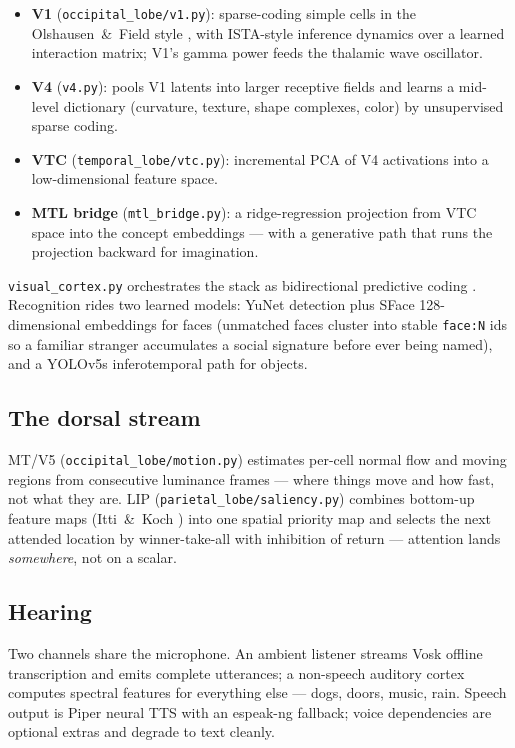 \documentclass[11pt]{article}
\newcommand{\code}[1]{\texttt{\small #1}}
\begin{document}
\begin{itemize}
  \item \textbf{V1} (\code{occipital\_lobe/v1.py}): sparse-coding
    simple cells in the Olshausen~\&~Field style \cite{olshausen}, with ISTA-style
    inference dynamics over a learned interaction matrix; V1's gamma
    power feeds the thalamic wave oscillator.
  \item \textbf{V4} (\code{v4.py}): pools V1 latents into larger
    receptive fields and learns a mid-level dictionary (curvature,
    texture, shape complexes, color) by unsupervised sparse coding.
  \item \textbf{VTC} (\code{temporal\_lobe/vtc.py}): incremental PCA of
    V4 activations into a low-dimensional feature space.
  \item \textbf{MTL bridge} (\code{mtl\_bridge.py}): a ridge-regression
    projection from VTC space into the concept embeddings --- with a
    generative path that runs the projection backward for imagination.
\end{itemize}

\code{visual\_cortex.py} orchestrates the stack as bidirectional
predictive coding \cite{rao,clark}. Recognition rides two learned models: YuNet
detection plus SFace 128-dimensional embeddings for faces (unmatched
faces cluster into stable \code{face:N} ids so a familiar stranger
accumulates a social signature before ever being named), and a YOLOv5s
inferotemporal path for objects.

\subsection{The dorsal stream}

MT/V5 (\code{occipital\_lobe/motion.py}) estimates per-cell normal flow
and moving regions from consecutive luminance frames --- where things
move and how fast, not what they are. LIP (\code{parietal\_lobe/saliency.py})
combines bottom-up feature maps (Itti~\&~Koch \cite{itti,koch}) into one spatial
priority map and selects the next attended location by winner-take-all
with inhibition of return --- attention lands \emph{somewhere}, not on
a scalar.

\subsection{Hearing}

Two channels share the microphone. An ambient listener streams Vosk
offline transcription and emits complete utterances; a non-speech
auditory cortex computes spectral features for everything else ---
dogs, doors, music, rain. Speech output is Piper neural TTS with an
espeak-ng fallback; voice dependencies are optional extras and degrade
to text cleanly.
\end{document}
